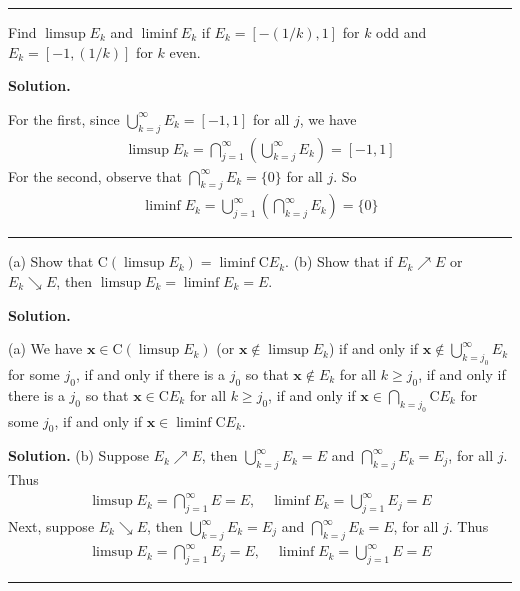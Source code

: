 \documentclass[12pt]{article}
\theoremstyle{definition}
\begin{document}
\bigskip\noindent\hrule\bigskip

Find $\limsup E_k$ and $\liminf E_k$ if $E_k=[-(1/k), 1]$ for $k$ odd and $E_k=[-1,(1/k)]$ for $k$ even.

\smallskip
\noindent\textbf{Solution.}\quad

For the first, since $\bigcup_{k=j}^\infty E_k=[-1,1]$ for all $j$, we have
\begin{align*}
\limsup E_k
=\bigcap_{j=1}^\infty\left(\bigcup_{k=j}^\infty E_k\right)
=[-1,1]
\end{align*}
For the second, observe that $\bigcap_{k=j}^\infty E_k=\{0\}$ for all $j$. So
\begin{align*}
\liminf E_k
=\bigcup_{j=1}^\infty\left(\bigcap_{k=j}^\infty E_k\right)
=\{0\}
\end{align*}



\bigskip\noindent\hrule\bigskip

(a) Show that $\mathrm{C}\left(\limsup E_k\right)=\liminf\mathrm{C}E_k$.
(b) Show that if $E_k\nearrow E$ or $E_k\searrow E$, then $\limsup E_k=\liminf E_k=E$.

\smallskip
\noindent\textbf{Solution.}\quad

(a) We have $\mathbf{x}\in\mathrm{C}\left(\limsup E_k\right)$ (or $\mathbf{x}\notin\limsup E_k$) if and only if $\mathbf{x}\notin\bigcup_{k=j_0}^\infty E_k$ for some $j_0$, if and only if there is a $j_0$ so that $\mathbf{x}\notin E_k$ for all $k\ge j_0$, if and only if there is a $j_0$ so that $\mathbf{x}\in\mathrm{C}E_k$ for all $k\ge j_0$, if and only if $\mathbf{x}\in\bigcap_{k=j_0}\mathrm{C}E_k$ for some $j_0$, if and only if $\mathbf{x}\in\liminf\mathrm{C}E_k$.

\smallskip
\noindent\textbf{Solution.}\quad
(b) Suppose $E_k\nearrow E$, then $\bigcup_{k=j}^\infty E_k=E$ and $\bigcap_{k=j}^\infty E_k=E_j$, for all $j$. Thus
\begin{align*}
\limsup E_k
=\bigcap_{j=1}^\infty E
=E,\quad
\liminf E_k
=\bigcup_{j=1}^\infty E_j
=E
\end{align*}
Next, suppose $E_k\searrow E$, then $\bigcup_{k=j}^\infty E_k=E_j$ and $\bigcap_{k=j}^\infty E_k=E$, for all $j$. Thus
\begin{align*}
\limsup E_k
=\bigcap_{j=1}^\infty E_j
=E,\quad
\liminf E_k
=\bigcup_{j=1}^\infty E
=E
\end{align*}



\bigskip\noindent\hrule\bigskip
\end{document}
